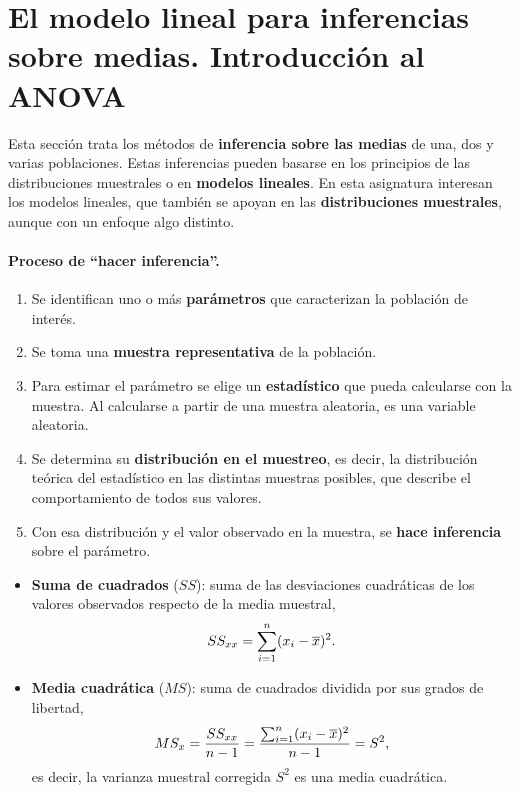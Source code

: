 \section{El modelo lineal para inferencias sobre medias. Introducción al ANOVA}
\label{sec:t1-medias}

Esta sección trata los métodos de \textbf{inferencia sobre las medias} de una, dos y varias
poblaciones. Estas inferencias pueden basarse en los principios de las distribuciones
muestrales o en \textbf{modelos lineales}. En esta asignatura interesan los modelos lineales,
que también se apoyan en las \textbf{distribuciones muestrales}, aunque con un enfoque algo
distinto.

\paragraph{Proceso de ``hacer inferencia''.}
\begin{enumerate}
  \item Se identifican uno o más \textbf{parámetros} que caracterizan la población de interés.
  \item Se toma una \textbf{muestra representativa} de la población.
  \item Para estimar el parámetro se elige un \textbf{estadístico} que pueda calcularse con la
    muestra. Al calcularse a partir de una muestra aleatoria, es una variable aleatoria.
  \item Se determina su \textbf{distribución en el muestreo}, es decir, la distribución
    teórica del estadístico en las distintas muestras posibles, que describe el
    comportamiento de todos sus valores.
  \item Con esa distribución y el valor observado en la muestra, se \textbf{hace inferencia}
    sobre el parámetro.
\end{enumerate}

\begin{definicion}
  \begin{itemize}
    \item \textbf{Suma de cuadrados} ($SS$): suma de las desviaciones cuadráticas de los valores
      observados respecto de la media muestral,
      \[ SS_{xx} = \sum_{i=1}^{n} (x_i-\overline{x})^2 . \]
    \item \textbf{Media cuadrática} ($MS$): suma de cuadrados dividida por sus grados de
      libertad,
      \[ MS_x = \frac{SS_{xx}}{n-1} = \frac{\sum_{i=1}^{n} (x_i-\overline{x})^2}{n-1} = S^2 , \]
      es decir, la varianza muestral corregida $S^2$ es una media cuadrática.
  \end{itemize}
\end{definicion}

